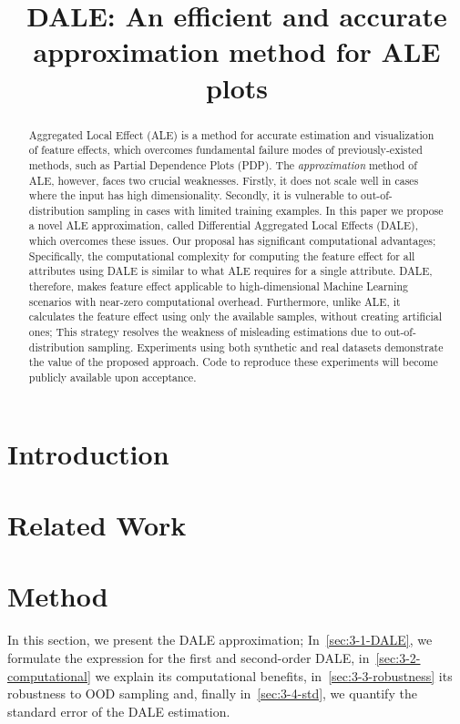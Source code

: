 \documentclass{article}
\title{DALE: An efficient and accurate approximation method for ALE plots}
\begin{document}
\maketitle

\begin{abstract}
  Aggregated Local Effect (ALE) is a method for accurate estimation
  and visualization of feature effects, which overcomes fundamental
  failure modes of previously-existed methods, such as Partial
  Dependence Plots (PDP). The \textit{approximation} method of ALE,
  however, faces two crucial weaknesses. Firstly, it does not scale
  well in cases where the input has high dimensionality. Secondly, it
  is vulnerable to out-of-distribution sampling in cases with limited
  training examples. In this paper we propose a novel ALE
  approximation, called Differential Aggregated Local Effects (DALE),
  which overcomes these issues. Our proposal has significant
  computational advantages; Specifically, the computational complexity
  for computing the feature effect for all attributes using DALE is
  similar to what ALE requires for a single attribute. DALE,
  therefore, makes feature effect applicable to high-dimensional
  Machine Learning scenarios with near-zero computational
  overhead. Furthermore, unlike ALE, it calculates the feature effect
  using only the available samples, without creating artificial ones;
  This strategy resolves the weakness of misleading estimations due to
  out-of-distribution sampling. Experiments using both synthetic and
  real datasets demonstrate the value of the proposed approach. Code
  to reproduce these experiments will become publicly available upon
  acceptance.
\end{abstract}

\section{Introduction}


\section{Related Work}


\section{Method}

In this section, we present the DALE approximation;
In~\ref{sec:3-1-DALE}, we formulate the expression for the first and
second-order DALE, in~\ref{sec:3-2-computational} we explain its
computational benefits, in~\ref{sec:3-3-robustness} its robustness to
OOD sampling and, finally in~\ref{sec:3-4-std}, we quantify the
standard error of the DALE estimation.
\end{document}
